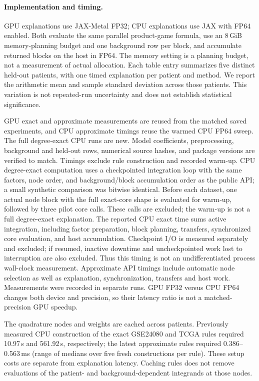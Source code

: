 \paragraph{Implementation and timing.}
GPU explanations use JAX-Metal FP32; CPU explanations use JAX with FP64
enabled. Both evaluate the same parallel product-game formula, use an
8\,GiB memory-planning budget and one background row per block, and
accumulate returned blocks on the host in FP64. The memory setting is a
planning budget, not a measurement of actual allocation.
Each table entry summarizes five distinct held-out patients, with one
timed explanation per patient and method. We report the arithmetic mean
and sample standard deviation across those patients. This variation is
not repeated-run uncertainty and does not establish statistical significance.

GPU exact and approximate measurements are reused from the matched saved
experiments, and CPU approximate timings reuse the warmed CPU FP64 sweep.
The full degree-exact CPU runs are new. Model coefficients, preprocessing,
background and held-out rows, numerical source hashes, and package versions
are verified to match. Timings exclude rule construction and recorded
warm-up. CPU degree-exact computation uses a checkpointed integration loop
with the same factors, node order, and background/block accumulation order
as the public API; a small synthetic comparison was bitwise identical.
Before each dataset, one actual node block with the full exact-core shape
is evaluated for warm-up, followed by three pilot core calls. These calls
are excluded; the warm-up is not a full degree-exact explanation.
The reported CPU exact time sums active integration, including factor
preparation, block planning, transfers, synchronized core evaluation, and
host accumulation. Checkpoint I/O is measured separately and excluded;
if resumed, inactive downtime and uncheckpointed work lost to interruption
are also excluded. Thus this timing is not an undifferentiated process
wall-clock measurement.
Approximate API timings include automatic node selection as well as
explanation, synchronization, transfers and host work. Measurements were
recorded in separate runs. GPU FP32 versus CPU FP64 changes both device
and precision, so their latency ratio is not a matched-precision GPU speedup.

The quadrature nodes and weights are cached across patients. Previously
measured CPU construction of the exact GSE24080 and TCGA rules required
10.97\,s and 561.92\,s, respectively; the latest approximate rules required
0.386--0.563\,ms (range of medians over five fresh constructions per rule).
These setup costs are separate from explanation latency. Caching rules
does not remove evaluations of the patient- and background-dependent
integrands at those nodes.

